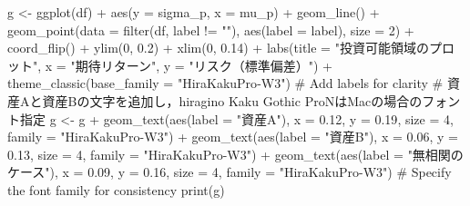\documentclass[
  letterpaper,
  pandoc,
  ja=standard,
  jafont = hiragino-pron]{ltjsbook}
\newenvironment{Shaded}{\begin{snugshade}}{\end{snugshade}}
\newcommand{\AttributeTok}[1]{\textcolor[rgb]{0.40,0.45,0.13}{#1}}
\newcommand{\CommentTok}[1]{\textcolor[rgb]{0.37,0.37,0.37}{#1}}
\newcommand{\DecValTok}[1]{\textcolor[rgb]{0.68,0.00,0.00}{#1}}
\newcommand{\FloatTok}[1]{\textcolor[rgb]{0.68,0.00,0.00}{#1}}
\newcommand{\FunctionTok}[1]{\textcolor[rgb]{0.28,0.35,0.67}{#1}}
\newcommand{\NormalTok}[1]{\textcolor[rgb]{0.00,0.23,0.31}{#1}}
\newcommand{\OtherTok}[1]{\textcolor[rgb]{0.00,0.23,0.31}{#1}}
\newcommand{\SpecialCharTok}[1]{\textcolor[rgb]{0.37,0.37,0.37}{#1}}
\newcommand{\StringTok}[1]{\textcolor[rgb]{0.13,0.47,0.30}{#1}}
\begin{document}
\begin{Shaded}
\begin{Highlighting}[]
\NormalTok{g }\OtherTok{\textless{}{-}} \FunctionTok{ggplot}\NormalTok{(df) }\SpecialCharTok{+} \FunctionTok{aes}\NormalTok{(}\AttributeTok{y =}\NormalTok{ sigma\_p, }\AttributeTok{x =}\NormalTok{ mu\_p) }\SpecialCharTok{+} \FunctionTok{geom\_line}\NormalTok{() }\SpecialCharTok{+} \FunctionTok{geom\_point}\NormalTok{(}\AttributeTok{data =} \FunctionTok{filter}\NormalTok{(df, label }\SpecialCharTok{!=} \StringTok{""}\NormalTok{), }\FunctionTok{aes}\NormalTok{(}\AttributeTok{label =}\NormalTok{ label), }\AttributeTok{size =} \DecValTok{2}\NormalTok{) }\SpecialCharTok{+} \FunctionTok{coord\_flip}\NormalTok{() }\SpecialCharTok{+} \FunctionTok{ylim}\NormalTok{(}\DecValTok{0}\NormalTok{, }\FloatTok{0.2}\NormalTok{) }\SpecialCharTok{+} \FunctionTok{xlim}\NormalTok{(}\DecValTok{0}\NormalTok{, }\FloatTok{0.14}\NormalTok{) }\SpecialCharTok{+}
  \FunctionTok{labs}\NormalTok{(}\AttributeTok{title =} \StringTok{"投資可能領域のプロット"}\NormalTok{, }\AttributeTok{x =} \StringTok{"期待リターン"}\NormalTok{, }\AttributeTok{y =} \StringTok{"リスク（標準偏差）"}\NormalTok{) }\SpecialCharTok{+} \FunctionTok{theme\_classic}\NormalTok{(}\AttributeTok{base\_family =} \StringTok{"HiraKakuPro{-}W3"}\NormalTok{) }\CommentTok{\# Add labels for clarity}
\CommentTok{\# 資産Aと資産Bの文字を追加し，hiragino Kaku Gothic ProNはMacの場合のフォント指定}
\NormalTok{g }\OtherTok{\textless{}{-}}\NormalTok{ g }\SpecialCharTok{+}
  \FunctionTok{geom\_text}\NormalTok{(}\FunctionTok{aes}\NormalTok{(}\AttributeTok{label =} \StringTok{"資産A"}\NormalTok{), }\AttributeTok{x =} \FloatTok{0.12}\NormalTok{, }\AttributeTok{y =} \FloatTok{0.19}\NormalTok{, }\AttributeTok{size =} \DecValTok{4}\NormalTok{, }\AttributeTok{family =} \StringTok{"HiraKakuPro{-}W3"}\NormalTok{) }\SpecialCharTok{+}
  \FunctionTok{geom\_text}\NormalTok{(}\FunctionTok{aes}\NormalTok{(}\AttributeTok{label =} \StringTok{"資産B"}\NormalTok{), }\AttributeTok{x =} \FloatTok{0.06}\NormalTok{, }\AttributeTok{y =} \FloatTok{0.13}\NormalTok{, }\AttributeTok{size =} \DecValTok{4}\NormalTok{, }\AttributeTok{family =} \StringTok{"HiraKakuPro{-}W3"}\NormalTok{) }\SpecialCharTok{+}
  \FunctionTok{geom\_text}\NormalTok{(}\FunctionTok{aes}\NormalTok{(}\AttributeTok{label =} \StringTok{"無相関のケース"}\NormalTok{), }\AttributeTok{x =} \FloatTok{0.09}\NormalTok{, }\AttributeTok{y =} \FloatTok{0.16}\NormalTok{, }\AttributeTok{size =} \DecValTok{4}\NormalTok{, }\AttributeTok{family =} \StringTok{"HiraKakuPro{-}W3"}\NormalTok{) }\CommentTok{\# Specify the font family for consistency}
\FunctionTok{print}\NormalTok{(g)}
\end{Highlighting}
\end{Shaded}
\end{document}
